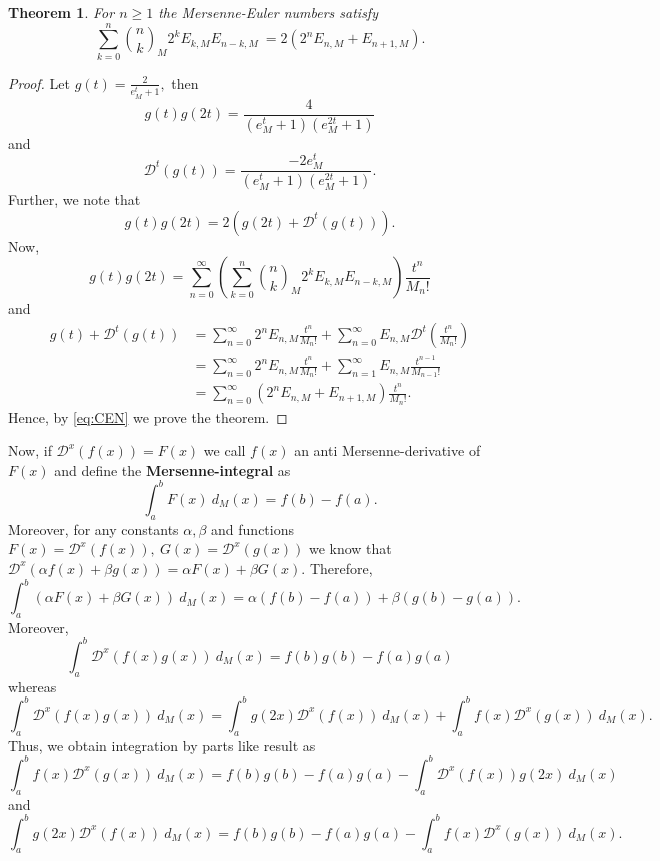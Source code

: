 \documentclass[12pt, a4paper]{article}
\newtheorem{theorem}{Theorem}[section]
\begin{document}
\begin{theorem}
For $n \geq 1$ the Mersenne-Euler numbers satisfy 
\begin{equation*}
\sum_{k=0}^{n}\binom{n}{k}_M2^kE_{k,M}E_{n-k,M}\ = 2(2^nE_{n,M}+E_{n+1,M}).
\end{equation*}
\end{theorem}
\begin{proof}
Let $g(t) = \frac{2}{e^t_M+1},$ then
\[g(t)g(2t) = \frac{4}{(e^t_M+1)(e^{2t}_M+1)}\]
and
\[\mathcal{D}^t(g(t)) = \frac{-2e^t_M}{(e^t_M+1)(e^{2t}_M+1)}.\]
Further, we note that
\begin{equation} \label{eq:CEN}
g(t)g(2t) = 2(g(2t) + \mathcal{D}^t(g(t))).
\end{equation}
Now,
\[g(t)g(2t) = \sum_{n=0}^{\infty}\left(\sum_{k=0}^{n}\binom{n}{k}_M2^kE_{k,M}E_{n-k,M}\right)\frac{t^n}{M_n!}\]
and
\begin{align*}
g(t)+\mathcal{D}^t(g(t)) &= \sum_{n=0}^{\infty}2^nE_{n,M}\frac{t^n}{M_n!}+\sum_{n=0}^{\infty}E_{n,M}\mathcal{D}^t\left(\frac{t^n}{M_n!}\right)\\
&= \sum_{n=0}^{\infty}2^nE_{n,M}\frac{t^n}{M_n!}+\sum_{n=1}^{\infty}E_{n,M}\frac{t^{n-1}}{M_{n-1}!}\\
&= \sum_{n=0}^{\infty}(2^nE_{n,M}+E_{n+1,M})\frac{t^n}{M_n!}.
\end{align*}
Hence, by \eqref{eq:CEN} we prove the theorem.
\end{proof}
Now, if $\mathcal{D}^x(f(x)) = F(x)$ we call $f(x)$ an anti Mersenne-derivative of $F(x)$ and define the \textbf{Mersenne-integral} as
\[\int_{a}^{b} F(x)~ d_M(x) = f(b)-f(a).\]
Moreover, for any constants $\alpha, \beta$ and functions $F(x) = \mathcal{D}^x(f(x)),~G(x) = \mathcal{D}^x(g(x))$ we know that
$\mathcal{D}^x(\alpha f(x)+\beta g(x)) = \alpha F(x) + \beta G(x).$ Therefore,
\[\int_{a}^{b} (\alpha F(x) + \beta G(x))~d_M(x) = \alpha(f(b)-f(a))+\beta(g(b)-g(a)).\]
Moreover,
\[\int_{a}^{b} \mathcal{D}^{x}(f(x)g(x))~d_M(x) = f(b)g(b)-f(a)g(a)\]
whereas 
\[\int_{a}^{b} \mathcal{D}^{x}(f(x)g(x))~d_M(x) = 
\int_{a}^{b} g(2x)\mathcal{D}^{x} (f(x)) ~d_M(x) +
\int_{a}^{b} f(x)\mathcal{D}^{x} (g(x))~d_M(x).\]
Thus, we obtain integration by parts like result as
\begin{equation}
\int_{a}^{b} f(x)\mathcal{D}^{x} (g(x))~d_M(x) = f(b)g(b)-f(a)g(a)-\int_{a}^{b} \mathcal{D}^{x} (f(x)) g(2x)~d_M(x)
\end{equation}
and 
\begin{equation} \label{eq:Int}
\int_{a}^{b} g(2x)\mathcal{D}^{x} (f(x)) ~d_M(x) = f(b)g(b)-f(a)g(a)-\int_{a}^{b} f(x)\mathcal{D}^{x} (g(x))~d_M(x).
\end{equation}
\end{document}
